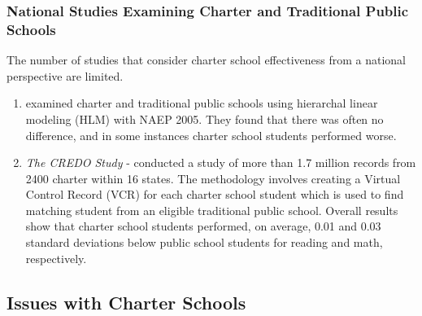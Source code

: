 \documentclass[10pt,handout,mathserif]{beamer}
\begin{document}
\begin{frame}[c]
	\frametitle{National Studies Examining Charter and Traditional Public Schools}
	The number of studies that consider charter school effectiveness from a national perspective are limited.
	\vspace{10pt}
	\begin{enumerate}
	    \setlength{\itemsep}{10pt}
		\item {} examined charter and traditional public schools using hierarchal linear modeling (HLM) with NAEP 2005. They found that there was often no difference, and in some instances charter school students performed worse.
		\pause
		\item \textit{The CREDO Study} -  conducted a study of more than 1.7 million records from 2400 charter within 16 states. The methodology involves creating a Virtual Control Record (VCR) for each charter school student which is used to find matching student from an eligible traditional public school.
		Overall results show that charter school students performed, on average, 0.01 and 0.03 standard deviations below public school students for reading and math, respectively.
	\end{enumerate}
\end{frame}


\subsection{Issues with Charter Schools}
\end{document}
